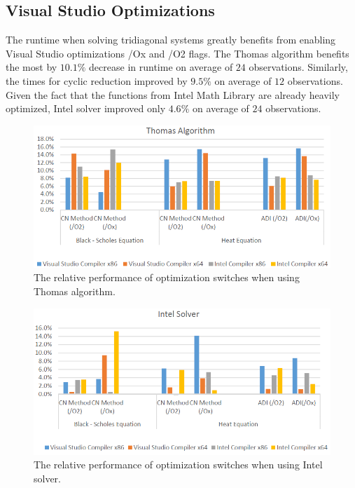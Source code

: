 \documentclass[12pt, oneside]{book}
\theoremstyle{plain}
\theoremstyle{definition}
\begin{document}
\subsection{Visual Studio Optimizations}
The runtime when solving tridiagonal systems greatly benefits from enabling Visual Studio optimizations /Ox and /O2 flags. The Thomas algorithm benefits the most by $10.1 \%$ decrease in runtime on average of  $24$ observations. Similarly, the times for cyclic reduction improved  by $9.5 \%$ on average of $12$ observations. Given the fact that the functions from Intel Math Library are already heavily optimized,  Intel solver improved only $4.6 \%$ on average of $24$ observations. 

\begin{figure}[!htb]
    \centering
    \includegraphics[scale=0.6]{thomasFlagBar.png}
    \caption{The relative performance of optimization switches when using Thomas algorithm.}
\end{figure}

\begin{figure}[!htb]
    \label{intelBar}
    \centering
        \includegraphics[scale=0.6]{intelFlagBar.png}
    \caption{The relative performance of optimization switches when using Intel solver.}
\end{figure} 
\end{document}
